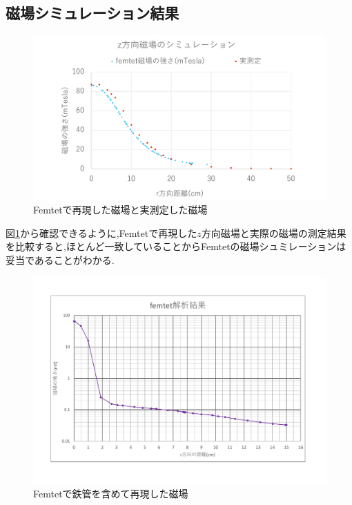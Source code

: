 \subsection{磁場シミュレーション結果}
\begin{figure}[tbp]
	\centering
		\includegraphics[width=16cm]{fig/iguchi/magnetgraph2.pdf}
	\caption{Femtetで再現した磁場と実測定した磁場}
	\label{magnetgraph2}
\end{figure}

図\ref{magnetgraph2}から確認できるように,Femtetで再現した$z$方向磁場と実際の磁場の測定結果を比較すると,ほとんど一致していることからFemtetの磁場シュミレーションは妥当であることがわかる.

\begin{figure}[tbp]
	\centering
		\includegraphics[width=15cm]{fig/iguchi/Femtetsaigengraph.pdf}
	\caption{Femtetで鉄管を含めて再現した磁場}
	\label{Femtetsaigengraph}
\end{figure}

